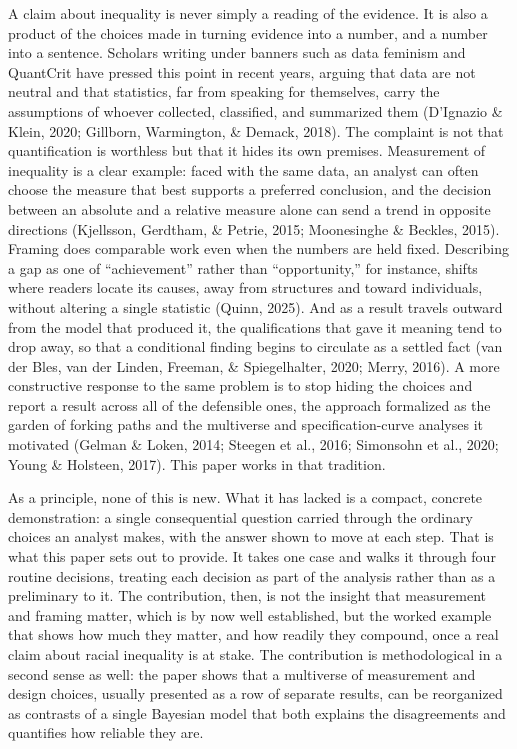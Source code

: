 \documentclass[
  12pt,
]{article}
\newcounter{none} %
\begin{document}
A claim about inequality is never simply a reading of the evidence. It
is also a product of the choices made in turning evidence into a number,
and a number into a sentence. Scholars writing under banners such as
data feminism and QuantCrit have pressed this point in recent years,
arguing that data are not neutral and that statistics, far from speaking
for themselves, carry the assumptions of whoever collected, classified,
and summarized them (D'Ignazio \& Klein, 2020; Gillborn, Warmington, \&
Demack, 2018). The complaint is not that quantification is worthless but
that it hides its own premises. Measurement of inequality is a clear
example: faced with the same data, an analyst can often choose the
measure that best supports a preferred conclusion, and the decision
between an absolute and a relative measure alone can send a trend in
opposite directions (Kjellsson, Gerdtham, \& Petrie, 2015; Moonesinghe
\& Beckles, 2015). Framing does comparable work even when the numbers
are held fixed. Describing a gap as one of ``achievement'' rather than
``opportunity,'' for instance, shifts where readers locate its causes,
away from structures and toward individuals, without altering a single
statistic (Quinn, 2025). And as a result travels outward from the model
that produced it, the qualifications that gave it meaning tend to drop
away, so that a conditional finding begins to circulate as a settled
fact (van der Bles, van der Linden, Freeman, \& Spiegelhalter, 2020;
Merry, 2016). A more constructive response to the same problem is to
stop hiding the choices and report a result across all of the defensible
ones, the approach formalized as the garden of forking paths and the
multiverse and specification-curve analyses it motivated (Gelman \&
Loken, 2014; Steegen et al., 2016; Simonsohn et al., 2020; Young \&
Holsteen, 2017). This paper works in that tradition.

As a principle, none of this is new. What it has lacked is a compact,
concrete demonstration: a single consequential question carried through
the ordinary choices an analyst makes, with the answer shown to move at
each step. That is what this paper sets out to provide. It takes one
case and walks it through four routine decisions, treating each decision
as part of the analysis rather than as a preliminary to it. The
contribution, then, is not the insight that measurement and framing
matter, which is by now well established, but the worked example that
shows how much they matter, and how readily they compound, once a real
claim about racial inequality is at stake. The contribution is
methodological in a second sense as well: the paper shows that a
multiverse of measurement and design choices, usually presented as a row
of separate results, can be reorganized as contrasts of a single
Bayesian model that both explains the disagreements and quantifies how
reliable they are.
\end{document}
